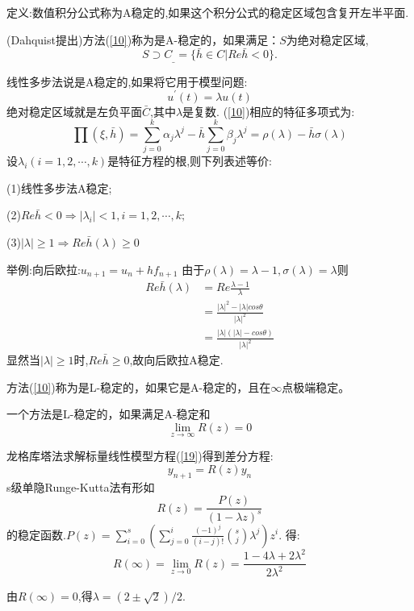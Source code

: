 \documentclass[12pt,a4paper]{article}
\begin{document}
定义:数值积分公式称为A稳定的,如果这个积分公式的稳定区域包含复开左半平面.

(Dahquist提出)方法(\ref{10})称为是A-稳定的，如果满足：$S$为绝对稳定区域,
\begin{equation*}
S\supset C_{\_}=\{\bar{h}\in C|Re\bar{h}<0\}.
\end{equation*}

线性多步法说是A稳定的,如果将它用于模型问题:
\begin{equation}
u^{'}(t)=\lambda u(t)
\label{19}
\end{equation}
绝对稳定区域就是左负平面$\bar{C}$,其中$\lambda$是复数.
(\ref{10})相应的特征多项式为:
\begin{equation}
\prod(\xi,\bar{h})=\sum_{j=0}^{k}\alpha_{j}\lambda^{j}-\bar{h}\sum_{j=0}^{k}\beta_{j}\lambda^{j}=\rho(\lambda)-\bar{h}\sigma(\lambda)
\end{equation}
设$\lambda_{i}(i=1,2,\cdots,k)$是特征方程的根,则下列表述等价:

(1)线性多步法A稳定;

(2)$Re\bar{h}<0\Rightarrow|\lambda_{i}|<1,i=1,2,\cdots,k;$

(3)$|\lambda|\ge 1\Rightarrow Re\bar{h}(\lambda)\ge 0$

举例:向后欧拉:$u_{n+1}=u_{n}+hf_{n+1}$
由于$\rho(\lambda)=\lambda-1,\sigma(\lambda)=\lambda$则
\begin{align}
Re\bar{h}(\lambda)&=Re\frac{\lambda-1}{\lambda}\\&=\frac{|\lambda|^2-|\lambda|cos\theta}{|\lambda|^2}\\&=\frac{|\lambda|(|\lambda|-cos\theta)}{|\lambda|^2}
\end{align}
显然当$|\lambda|\ge 1$时,$Re\bar{h}\ge 0$,故向后欧拉A稳定.

方法(\ref{10})称为是L-稳定的，如果它是A-稳定的，且在$\infty$点极端稳定。

一个方法是L-稳定的，如果满足A-稳定和
\begin{equation*}
\lim\limits_{z\to\infty}R(z)=0
\end{equation*}

龙格库塔法求解标量线性模型方程(\ref{19})得到差分方程:
\begin{equation}
y_{n+1}=R(z)y_{n}
\end{equation}
s级单隐Runge-Kutta法有形如
\begin{equation}
R(z)=\frac{P(z)}{(1-\lambda z)^s}
\end{equation}
的稳定函数.$P(z)=\sum_{i=0}^{s}(\sum_{j=0}^{i}\frac{(-1)^j}{(i-j)!}\binom{s}{j}\lambda^j)z^i$.
得:
\begin{equation}
R(\infty)=\lim\limits_{z\to 0}R(z)=\frac{1-4\lambda+2\lambda^2}{2\lambda^2}
\end{equation}

由$R(\infty)=0$,得$\lambda=(2\pm\sqrt{2})/2$.


\cite{tam19912d}

\end{document}
